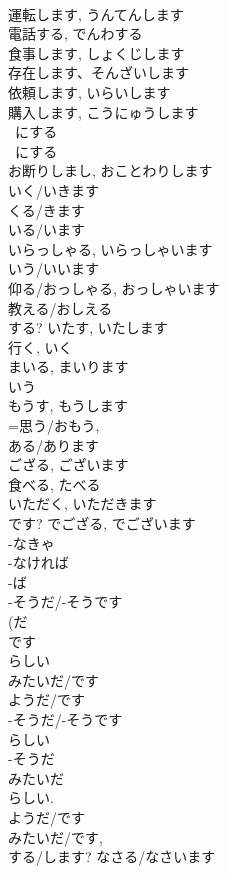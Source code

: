 \documentclass[8pt]{extreport}
\begin{document}
\begin{CJK}{UTF8}{min}
\\	運転します, うんてんします			
\\	電話する, でんわする			
\\	食事します, しょくじします			
\\	存在します、そんざいします			
\\	依頼します, いらいします			
\\	購入します, こうにゅうします			
\\	~にする	
\\	~にする	
\\	お断りしまし, おことわりします
\\	いく/いきます 
\\	くる/きます
\\	いる/います
\\	いらっしゃる, いらっしゃいます	
\\	いう/いいます 
\\	仰る/おっしゃる, おっしゃいます	
\\	教える/おしえる 
\\	する?	いたす, いたします	
\\	行く, いく 
\\	まいる, まいります	
\\	いう 
\\	もうす, もうします	
\\	=思う/おもう, 
\\	ある/あります 
\\	ござる, ございます	
\\	食べる, たべる 
\\	いただく, いただきます	
\\	です?	でござる, でございます	
\\	-なきゃ 
\\	-なければ 
\\	-ば 
\\	-そうだ/-そうです
\\	(だ 
\\	です
\\	らしい 
\\	みたいだ/です 
\\	ようだ/です
\\	-そうだ/-そうです
\\	らしい 
\\	-そうだ 
\\	みたいだ 
\\	らしい. 
\\	ようだ/です
\\	みたいだ/です, 
\\	する/します?	なさる/なさいます	

\end{CJK}
\end{document}
